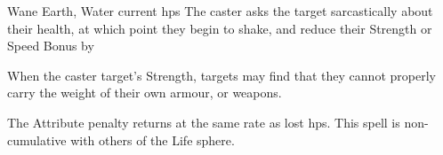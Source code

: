   {}%
  {Wane}%
  {Earth, Water}%
  {current \glspl{hp}}%
  {The caster asks the target sarcastically about their health, at which point they begin to shake, and reduce their Strength or Speed Bonus by }%
  {When the caster target's Strength, targets may find that they cannot properly carry the weight of their own armour, or weapons.

    The Attribute penalty returns at the same rate as lost \glspl{hp}.
    This spell is non-cumulative with others of the Life sphere.}
